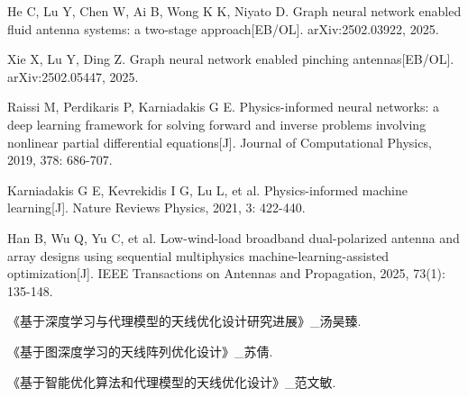 \documentclass[UTF8,a4paper,12pt]{ctexart}
\begin{document}
\begin{enumerate}[label={\textnormal{[\arabic*]}},leftmargin=2.8em,itemsep=0.35em]
\item He C, Lu Y, Chen W, Ai B, Wong K K, Niyato D. Graph neural network enabled fluid antenna systems: a two-stage approach[EB/OL]. arXiv:2502.03922, 2025.
\item Xie X, Lu Y, Ding Z. Graph neural network enabled pinching antennas[EB/OL]. arXiv:2502.05447, 2025.
\item Raissi M, Perdikaris P, Karniadakis G E. Physics-informed neural networks: a deep learning framework for solving forward and inverse problems involving nonlinear partial differential equations[J]. Journal of Computational Physics, 2019, 378: 686-707.
\item Karniadakis G E, Kevrekidis I G, Lu L, et al. Physics-informed machine learning[J]. Nature Reviews Physics, 2021, 3: 422-440.
\item Han B, Wu Q, Yu C, et al. Low-wind-load broadband dual-polarized antenna and array designs using sequential multiphysics machine-learning-assisted optimization[J]. IEEE Transactions on Antennas and Propagation, 2025, 73(1): 135-148.
\item 《基于深度学习与代理模型的天线优化设计研究进展》\_汤昊臻.
\item 《基于图深度学习的天线阵列优化设计》\_苏倩.
\item 《基于智能优化算法和代理模型的天线优化设计》\_范文敏.
\end{enumerate}
\end{document}
